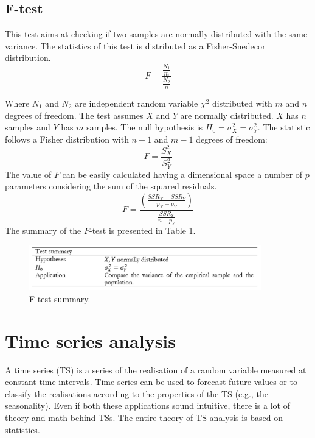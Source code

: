 \subsection{F-test}
This test aims at checking if two samples are normally distributed with the same variance. The statistics of this test is distributed as a Fisher-Snedecor distribution.
\begin{equation}
F=\frac{\frac{N_1}{m}}{\frac{N_2}{n}}
\label{eq_FisherDistribution}
\end{equation}

Where $N_1$ and $N_2$ are independent random variable $\chi^2$ distributed with $m$ and $n$ degrees of freedom. The test assumes $X$ and $Y$ are normally distributed. $X$ has $n$ samples and $Y$ has $m$ samples. The null hypothesis is $H_0=\sigma_X^2=\sigma_Y^2$. The statistic follows a Fisher distribution with $n-1$ and $m-1$ degrees of freedom:
\begin{equation}
F=\frac{S_X^2}{S_Y^2}
\label{eq_FisherTest1}
\end{equation}
The value of $F$ can be easily calculated having a dimensional space a number of $p$ parameters considering the sum of the squared residuals.
\begin{equation}
F=\frac{\left(\frac{SSR_X-SSR_Y}{p_X-p_Y}\right)}{\frac{SSR_Y}{n-p_Y}}
\label{eq_FisherTest2}
\end{equation}
The summary of the $F$-test is presented in Table \ref{tab_Ftest}.

\begin{figure}[hbt!]
\centering
\includegraphics[width=0.9\textwidth]{SectionLetsMath/elemStat_figures/tab_Ftest.png}
\captionsetup{type=table}
\caption{F-test summary.}
\label{tab_Ftest}
\end{figure}

\section{Time series analysis} \label{secTimeSeries}


A time series (TS) is a series of the realisation of a random variable measured at constant time intervals. Time series can be used to forecast future values or to classify the realisations according to the properties of the TS (e.g., the seasonality). Even if both these applications sound intuitive, there is a lot of theory and math behind TSs. The entire theory of TS analysis is based on statistics.\par

